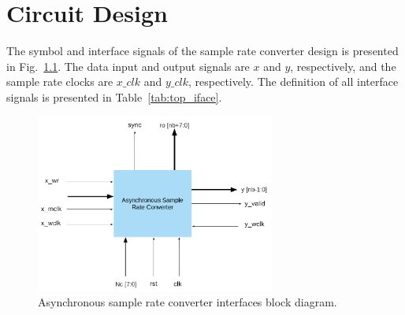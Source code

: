 \chapter{Circuit Design}
\label{chapter:circ_design}

The symbol and interface signals of the sample rate converter design is
presented in Fig.~\ref{fig:bd_top_iface}. The data input and output signals are
$x$ and $y$, respectively, and the sample rate clocks are $x\_clk$ and $y\_clk$,
respectively. The definition of all interface signals is presented in
Table~\ref{tab:top_iface}.

\begin{figure}[!htb]
  \centering
  \includegraphics[width=0.7\textwidth]{Figures/asrc_iface_bd.png}
  \caption{Asynchronous sample rate converter interfaces block diagram.}
  \label{fig:bd_top_iface}
\end{figure}

